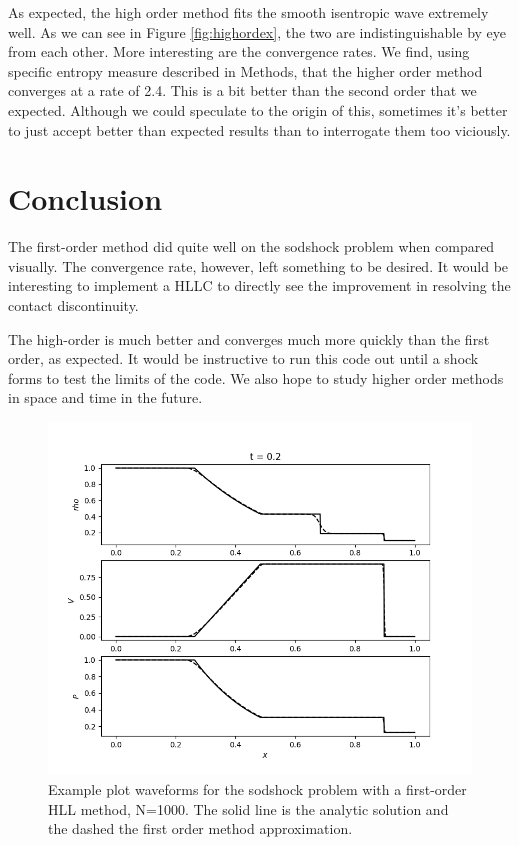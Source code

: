\documentclass{article}
\begin{document}
As expected, the high order method fits the smooth isentropic wave extremely well. As we can see in Figure \ref{fig:highordex}, the two are indistinguishable by eye from each other. More interesting are the convergence rates. We find, using specific entropy measure described in Methods, that the higher order method converges at a rate of 2.4. This is a bit better than the second order that we expected. Although we could speculate to the origin of this, sometimes it's better to just accept better than expected results than to interrogate them too viciously. 


\section*{Conclusion}

The first-order method did quite well on the sodshock problem when compared visually. The convergence rate, however, left something to be desired. It would be interesting to implement a HLLC to directly see the improvement in resolving the contact discontinuity. 

The high-order is much better and converges much more quickly than the first order, as expected. It would be instructive to run this code out until a shock forms to test the limits of the code. We also hope to study higher order methods in space and time in the future. 


\begin{figure}[h]
    \includegraphics[width=\textwidth]{onedimex1000.png}
    \caption{Example plot waveforms for the sodshock problem with a first-order HLL method, N=1000. The solid line is the analytic solution and the dashed the first order method approximation. }
    \label{fig:onedimex}
\end{figure}
\end{document}

